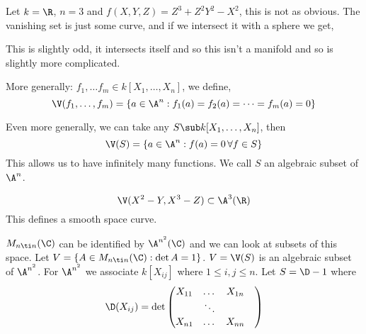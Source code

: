 \begin{eg}
  Let $k = \R$, $n = 3$ and $f(X, Y, Z) = Z^3 + Z^2Y^2 - X^2$, this is not as obvious. The vanishing set is just some curve, and if we intersect it with a sphere we get,

  This is slightly odd, it intersects itself and so this isn't a manifold and so is slightly more complicated.
\end{eg}

\noindent
More generally: $f_1, \dots f_m \in k[X_1, \dots, X_n]$, we define,
$$ \V(f_1, \dots, f_m) = \{a \in \A^n : f_1(a) = f_2(a) = \dots = f_m(a) = 0\} $$

Even more generally, we can take any $S \sub k[X_1, \dots, X_n]$, then
$$ \V(S) = \{a \in \A^n : f(a) = 0 \,\forall f \in S\} $$
This allows us to have infinitely many functions. We call $S$ an algebraic subset of $\A^n$.

\begin{eg}
  $$ \V(X^2 - Y, X^3 - Z) \subset \A^3(\R) $$
  This defines a smooth space curve.
\end{eg}

\begin{eg}
  $M_{n\ti n}(\C)$ can be identified by $\A^{n^2}(\C)$ and we can look at subsets of this space. Let $V = \{ A \in M_{n \ti n}(\C) : \det A = 1 \}$. $V = \V(S)$ is an algebraic subset of $\A^{n^2}$. For $\A^{n^2}$ we associate $k[X_{ij}]$ where $1 \le i, j \le n$. Let $S = \D - 1$ where
  $$ \D(X_{ij}) = \det \begin{pmatrix}
    X_{11} & \dots & X_{1n} \\
     & \ddots & &\\
    X_{n1} & \dots & X_{nn}
  \end{pmatrix} $$
\end{eg}

